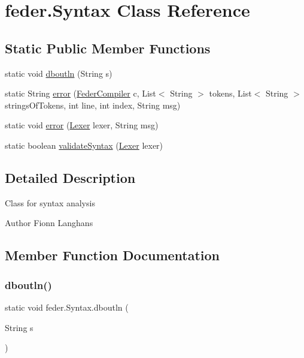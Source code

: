 \hypertarget{classfeder_1_1Syntax}{}\section{feder.\+Syntax Class Reference}
\label{classfeder_1_1Syntax}
\subsection*{Static Public Member Functions}
\begin{DoxyCompactItemize}
\item 
static void \hyperlink{classfeder_1_1Syntax_a198da2aacfac7f024efb627b2841bd83}{dboutln} (String s)
\item 
static String \hyperlink{classfeder_1_1Syntax_a2f56ae8134a76f0ad4d6ab7d32212540}{error} (\hyperlink{classfeder_1_1FederCompiler}{Feder\+Compiler} c, List$<$ String $>$ tokens, List$<$ String $>$ strings\+Of\+Tokens, int line, int index, String msg)
\item 
static void \hyperlink{classfeder_1_1Syntax_abc052dad01cea140ef0508050e1942fb}{error} (\hyperlink{classfeder_1_1Lexer}{Lexer} lexer, String msg)
\item 
static boolean \hyperlink{classfeder_1_1Syntax_a1a609489260f826347f03bdd34f94b98}{validate\+Syntax} (\hyperlink{classfeder_1_1Lexer}{Lexer} lexer)
\end{DoxyCompactItemize}


\subsection{Detailed Description}
Class for syntax analysis \begin{DoxyAuthor}{Author}
Fionn Langhans 
\end{DoxyAuthor}


\subsection{Member Function Documentation}
\mbox{\label{classfeder_1_1Syntax_a198da2aacfac7f024efb627b2841bd83}} 
\subsubsection{\texorpdfstring{dboutln()}{dboutln()}}
{\footnotesize\ttfamily static void feder.\+Syntax.\+dboutln (\begin{DoxyParamCaption}\item[{String}]{s }\end{DoxyParamCaption})\hspace{0.3cm}{\ttfamily [static]}}

